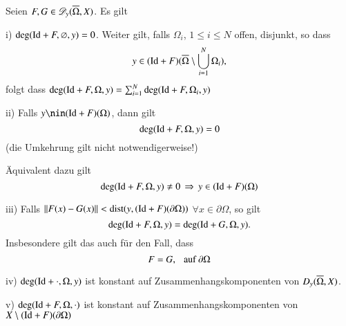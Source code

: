 \begin{theorem}\label{3.11}
    Seien $F,G\in \mathscr D_y(\overline\Omega,X)$. Es gilt
    \begin{description}
        \item{i)}
        $\deg(\mathrm{Id}+F,\varnothing,y)=0$. Weiter gilt, falls $\Omega_i$, $1\leq i\leq N$ offen, disjunkt,
        so dass
        \[
            y\in (\mathrm{Id}+F)(\overline\Omega\setminus\bigcup_{i=1}^N\Omega_i),
        \]
        folgt dass $\deg(\mathrm{Id}+F,\Omega,y)=\sum_{i=1}^N \deg(\mathrm{Id}+F,\Omega_i,y)$
        \item{ii)}
        Falls $y\nin (\Id+F)(\Omega)$, dann gilt
        \[
            \deg(\mathrm{Id}+F,\Omega,y)=0
        \]
        (die Umkehrung gilt nicht notwendigerweise!)

        Äquivalent dazu gilt
        \[
            \deg(\mathrm{Id}+F,\Omega,y)\neq 0 \, \Rightarrow \, y\in (\mathrm{Id}+F)(\Omega)
        \]
        \item{iii)}
        Falls $\|F(x)-G(x)\|<\mathrm{dist}(y,(\mathrm{Id}+F)(\partial\Omega))$ $\forall x\in \partial \Omega$, so gilt
        \[
            \deg(\mathrm{Id}+F,\Omega,y)=\deg(\mathrm{Id}+G,\Omega,y).
        \]
        Insbesondere gilt das auch für den Fall, dass
        \[
            F=G,\hspace{.25cm} \text{auf } \partial \Omega
        \]
        \item{iv)}
        $\deg(\mathrm{Id}+\cdot,\Omega,y)$ ist konstant auf Zusammenhangskomponenten von $D_y(\overline\Omega,X)$.
        \item{v)}
        $\deg(\mathrm{Id}+F,\Omega,\cdot)$ ist konstant auf Zusammenhangskomponenten von $X\setminus 
        (\mathrm{Id}+F)(\partial \Omega)$
    \end{description}
\end{theorem}
